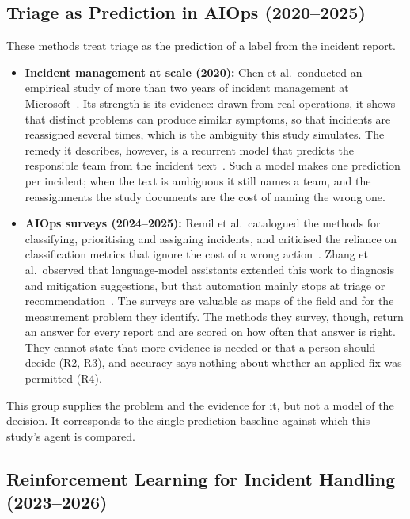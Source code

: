 \subsection{Triage as Prediction in AIOps (2020--2025)}

These methods treat triage as the prediction of a label from the incident report.

\begin{itemize}
\item \textbf{Incident management at scale (2020):} Chen et al.\ conducted an empirical study of more than two years of incident management at Microsoft~\cite{chen2020}. Its strength is its evidence: drawn from real operations, it shows that distinct problems can produce similar symptoms, so that incidents are reassigned several times, which is the ambiguity this study simulates. The remedy it describes, however, is a recurrent model that predicts the responsible team from the incident text~\cite{chen2020}. Such a model makes one prediction per incident; when the text is ambiguous it still names a team, and the reassignments the study documents are the cost of naming the wrong one.

\item \textbf{AIOps surveys (2024--2025):} Remil et al.\ catalogued the methods for classifying, prioritising and assigning incidents, and criticised the reliance on classification metrics that ignore the cost of a wrong action~\cite{remil2024}. Zhang et al.\ observed that language-model assistants extended this work to diagnosis and mitigation suggestions, but that automation mainly stops at triage or recommendation~\cite{zhang2025}. The surveys are valuable as maps of the field and for the measurement problem they identify. The methods they survey, though, return an answer for every report and are scored on how often that answer is right. They cannot state that more evidence is needed or that a person should decide (R2, R3), and accuracy says nothing about whether an applied fix was permitted (R4).
\end{itemize}

This group supplies the problem and the evidence for it, but not a model of the decision. It corresponds to the single-prediction baseline against which this study's agent is compared.

\subsection{Reinforcement Learning for Incident Handling (2023--2026)}

